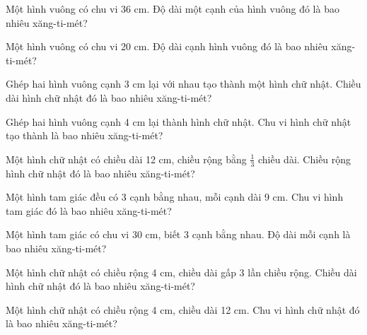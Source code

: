 \begin{ex}
Một hình vuông có chu vi 36 cm. Độ dài một cạnh của hình vuông đó là bao nhiêu xăng-ti-mét?
\end{ex}

\begin{ex}
Một hình vuông có chu vi 20 cm. Độ dài cạnh hình vuông đó là bao nhiêu xăng-ti-mét?
\end{ex}

\begin{ex}
Ghép hai hình vuông cạnh 3 cm lại với nhau tạo thành một hình chữ nhật. Chiều dài hình chữ nhật đó là bao nhiêu xăng-ti-mét?
\end{ex}

\begin{ex}
Ghép hai hình vuông cạnh 4 cm lại thành hình chữ nhật. Chu vi hình chữ nhật tạo thành là bao nhiêu xăng-ti-mét?
\end{ex}

\begin{ex}
Một hình chữ nhật có chiều dài 12 cm, chiều rộng bằng $\frac{1}{3}$ chiều dài. Chiều rộng hình chữ nhật đó là bao nhiêu xăng-ti-mét?
\end{ex}

\begin{ex}
Một hình tam giác đều có 3 cạnh bằng nhau, mỗi cạnh dài 9 cm. Chu vi hình tam giác đó là bao nhiêu xăng-ti-mét?
\end{ex}

\begin{ex}
Một hình tam giác có chu vi 30 cm, biết 3 cạnh bằng nhau. Độ dài mỗi cạnh là bao nhiêu xăng-ti-mét?
\end{ex}

\begin{ex}
Một hình chữ nhật có chiều rộng 4 cm, chiều dài gấp 3 lần chiều rộng. Chiều dài hình chữ nhật đó là bao nhiêu xăng-ti-mét?
\end{ex}

\begin{ex}
Một hình chữ nhật có chiều rộng 4 cm, chiều dài 12 cm. Chu vi hình chữ nhật đó là bao nhiêu xăng-ti-mét?
\end{ex}

